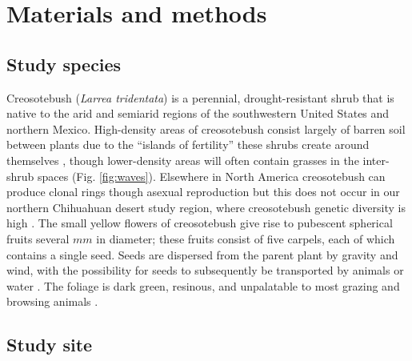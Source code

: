 \documentclass[11pt]{article}\usepackage[]{graphicx}\usepackage[usenames,dvipsnames]{xcolor}
\begin{document}
\section*{Materials and methods}

\subsection*{Study species}

Creosotebush (\textit{Larrea tridentata}) is a perennial, drought-resistant  shrub that is native to the arid and semiarid regions of the southwestern United States and northern Mexico.
High-density areas of creosotebush consist largely of barren soil between plants due to the ``islands of fertility'' these shrubs create around themselves \citep{schlesinger1996spatial, reynolds1999impact}, though lower-density areas will often contain grasses in the inter-shrub spaces (Fig. \ref{fig:waves}).
Elsewhere in North America creosotebush can produce clonal rings though asexual reproduction \citep{vasek1980creosote} but this does not occur in our northern Chihuahuan desert study region, where creosotebush genetic diversity is high \citep{duran2005genetic}. 
The small yellow flowers of creosotebush give rise to pubescent spherical fruits several $mm$ in diameter; these fruits consist of five carpels, each of which contains a single seed.
Seeds are dispersed from the parent plant by gravity and wind, with the possibility for seeds to subsequently be transported by animals or water \citep{maddox1985wind}. 
The foliage is dark green, resinous, and unpalatable to most grazing and browsing animals \citep{mabry1978creosote}.

\subsection*{Study site}
\end{document}
